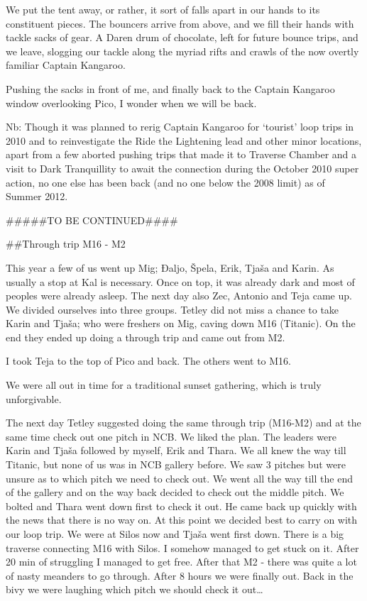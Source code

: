 We put the tent away, or rather, it sort of falls apart in our hands to
its constituent pieces. The bouncers arrive from above, and we fill
their hands with tackle sacks of gear. A Daren drum of chocolate, left
for future bounce trips, and we leave, slogging our tackle along the
myriad rifts and crawls of the now overtly familiar Captain Kangaroo.

Pushing the sacks in front of me, and finally back to the Captain
Kangaroo window overlooking Pico, I wonder when we will be back.

Nb: Though it was planned to rerig Captain Kangaroo for `tourist' loop
trips in 2010 and to reinvestigate the Ride the Lightening lead and
other minor locations, apart from a few aborted pushing trips that made
it to Traverse Chamber and a visit to Dark Tranquillity to await the
connection during the October 2010 super action, no one else has been
back (and no one below the 2008 limit) as of Summer 2012.

\#\#\#\#\#TO BE CONTINUED\#\#\#\#


\#\#Through trip M16 - M2

This year a few of us went up Mig; Đaljo, Špela, Erik, Tjaša and Karin.
As usually a stop at Kal is necessary. Once on top, it was already dark
and most of peoples were already asleep. The next day also Zec, Antonio
and Teja came up. We divided ourselves into three groups. Tetley did not
miss a chance to take Karin and Tjaša; who were freshers on Mig, caving
down M16 (Titanic). On the end they ended up doing a through trip and
came out from M2.

I took Teja to the top of Pico and back. The others went to M16.

We were all out in time for a traditional sunset gathering, which is
truly unforgivable.

The next day Tetley suggested doing the same through trip (M16-M2) and
at the same time check out one pitch in NCB. We liked the plan. The
leaders were Karin and Tjaša followed by myself, Erik and Thara. We all
knew the way till Titanic, but none of us was in NCB gallery before. We
saw 3 pitches but were unsure as to which pitch we need to check out. We
went all the way till the end of the gallery and on the way back decided
to check out the middle pitch. We bolted and Thara went down first to
check it out. He came back up quickly with the news that there is no way
on. At this point we decided best to carry on with our loop trip. We
were at Silos now and Tjaša went first down. There is a big traverse
connecting M16 with Silos. I somehow managed to get stuck on it. After
20 min of struggling I managed to get free. After that M2 - there was
quite a lot of nasty meanders to go through. After 8 hours we were
finally out. Back in the bivy we were laughing which pitch we should
check it out\ldots{}

